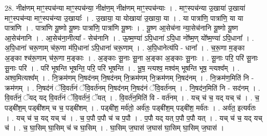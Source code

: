 \documentclass[17pt]{extarticle}
\begin{document}
28. नीक्ष॑णम् माꣳ॒॒स्पच॑न्या माꣳ॒॒स्पच॑न्या॒ नीक्ष॑ण॒म् नीक्ष॑णम् माꣳ॒॒स्पच॑न्याः । . माꣳ॒॒स्पच॑न्या उ॒खाया॑ उ॒खाया॑ माꣳ॒॒स्पच॑न्या माꣳ॒॒स्पच॑न्या उ॒खायाः᳚ । . उ॒खाया॒ या योखाया॑ उ॒खाया॒ या । . या पात्रा॑णि॒ पात्रा॑णि॒ या या पात्रा॑णि । . पात्रा॑णि यू॒ष्णो यू॒ष्णः पात्रा॑णि॒ पात्रा॑णि यू॒ष्णः । . यू॒ष्ण आ॒सेच॑ना न्या॒सेच॑नानि यू॒ष्णो यू॒ष्ण आ॒सेच॑नानि । . आ॒सेच॑ना॒नीत्या᳚ - सेच॑नानि । . ऊ॒ष्म॒ण्या॑ ऽपि॒धाना॑ ऽपि॒धा नो᳚ष्म॒ण् यो᳚ष्म॒ण्या॑ ऽपि॒धाना᳚ । . अ॒पि॒धाना॑ चरू॒णाम् च॑रू॒णा म॑पि॒धाना॑ ऽपि॒धाना॑ चरू॒णाम् । . अ॒पि॒धानेत्य॑पि - धाना᳚ । . च॒रू॒णा म॒ङ्का अ॒ङ्का श्च॑रू॒णाम् च॑रू॒णा म॒ङ्काः । . अ॒ङ्काः सू॒नाः सू॒ना अ॒ङ्का अ॒ङ्काः सू॒नाः । . सू॒नाः परि॒ परि॑ सू॒नाः सू॒नाः परि॑ । . परि॑ भूषन्ति भूषन्ति॒ परि॒ परि॑ भूषन्ति । . भू॒ष॒ न्त्यश्व॒ मश्व॑म् भूषन्ति भूष॒ न्त्यश्व᳚म् । . अश्व॒मित्यश्व᳚म् । . नि॒क्रम॑णम् नि॒षद॑नम् नि॒षद॑नम् नि॒क्रम॑णम् नि॒क्रम॑णम् नि॒षद॑नम् । . नि॒क्रम॑ण॒मिति॑ नि - क्रम॑णम् । . नि॒षद॑नं ॅवि॒वर्त॑नं ॅवि॒वर्त॑नम् नि॒षद॑नम् नि॒षद॑नं ॅवि॒वर्त॑नम् । . नि॒षद॑न॒मिति॑ नि - सद॑नम् । . वि॒वर्त॑नं॒ ॅयद् यद् वि॒वर्त॑नं ॅवि॒वर्त॑नं॒ ॅयत् । . वि॒वर्त॑न॒मिति॑ वि - वर्त॑नम् । . यच् च॑ च॒ यद् यच् च॑ । . च॒ पड्बी॑श॒म् पड्बी॑शम् च च॒ पड्बी॑शम् । . पड्बी॑श॒ मर्व॑तो॒ अर्व॑तः॒ पड्बी॑श॒म् पड्बी॑श॒ मर्व॑तः । . अर्व॑त॒ इत्यर्व॑तः । . यच् च॑ च॒ यद् यच् च॑ । . च॒ प॒पौ प॒पौ च॑ च प॒पौ । . प॒पौ यद् यत् प॒पौ प॒पौ यत् । . यच् च॑ च॒ यद् यच् च॑ । . च॒ घा॒सिम् घा॒सिम् च॑ च घा॒सिम् । . घा॒सिम् ज॒घास॑ ज॒घास॑ घा॒सिम् घा॒सिम् ज॒घास॑ । \newline
\end{document}
